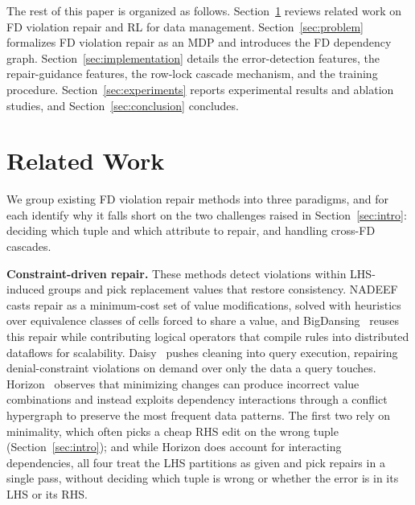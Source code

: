 \documentclass[sigconf]{acmart}
\begin{document}
The rest of this paper is organized as follows. Section~\ref{sec:related} reviews related work on FD violation repair and RL for data management. Section~\ref{sec:problem} formalizes FD violation repair as an MDP and introduces the FD dependency graph. Section~\ref{sec:implementation} details the error-detection features, the repair-guidance features, the row-lock cascade mechanism, and the training procedure. Section~\ref{sec:experiments} reports experimental results and ablation studies, and Section~\ref{sec:conclusion} concludes.

\section{Related Work}
\label{sec:related}

We group existing FD violation repair methods into three paradigms, and for each identify why it falls short on the two challenges raised in Section~\ref{sec:intro}: deciding which tuple and which attribute to repair, and handling cross-FD cascades.

\noindent\textbf{Constraint-driven repair.}
These methods detect violations within LHS-induced groups and pick replacement values that restore consistency. NADEEF~\cite{b2} casts repair as a minimum-cost set of value modifications, solved with heuristics over equivalence classes of cells forced to share a value, and BigDansing~\cite{b33} reuses this repair while contributing logical operators that compile rules into distributed dataflows for scalability. Daisy~\cite{b34} pushes cleaning into query execution, repairing denial-constraint violations on demand over only the data a query touches. Horizon~\cite{b35} observes that minimizing changes can produce incorrect value combinations and instead exploits dependency interactions through a conflict hypergraph to preserve the most frequent data patterns. The first two rely on minimality, which often picks a cheap RHS edit on the wrong tuple (Section~\ref{sec:intro}); and while Horizon does account for interacting dependencies, all four treat the LHS partitions as given and pick repairs in a single pass, without deciding which tuple is wrong or whether the error is in its LHS or its RHS.
\end{document}
